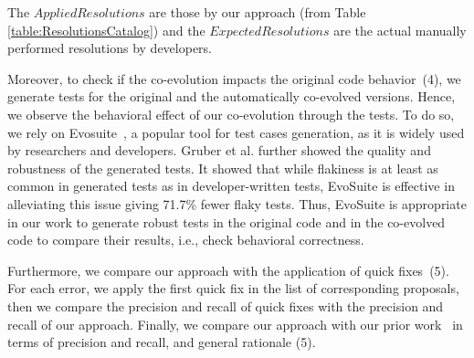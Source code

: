 	The $Applied Resolutions$ are those by our approach (from Table \ref{table:ResolutionsCatalog}) and  the $Expected Resolutions$ are the actual manually performed resolutions by developers.  %
	
	Moreover, to check if the co-evolution impacts the original code behavior~(4), we generate tests for the original and the automatically co-evolved versions. Hence, we observe the behavioral effect of our co-evolution through the tests. To do so, we rely on Evosuite~\cite{fraser2011evosuite}, a popular tool for test cases generation, as it is widely used by researchers and developers. 
	Gruber et al. \cite{gruber2023automatic} further showed the quality and robustness of the generated tests. It showed that while flakiness is at least as common in generated tests as in developer-written tests, EvoSuite is effective in alleviating this issue giving 71.7\% fewer flaky tests. Thus, EvoSuite is appropriate in our work to generate robust tests in the original code and in the co-evolved code to compare their results, i.e., check behavioral correctness.
	
	Furthermore, we compare our approach with the application of quick fixes~(5). For each error, we apply the first quick fix in the list of corresponding proposals, then we compare the precision and recall of quick fixes with the precision and recall of our approach.
	Finally, we compare our approach with our prior work~\cite{Khelladi2020} in terms of precision and recall, and general rationale (5).
	
	
	
	
	
